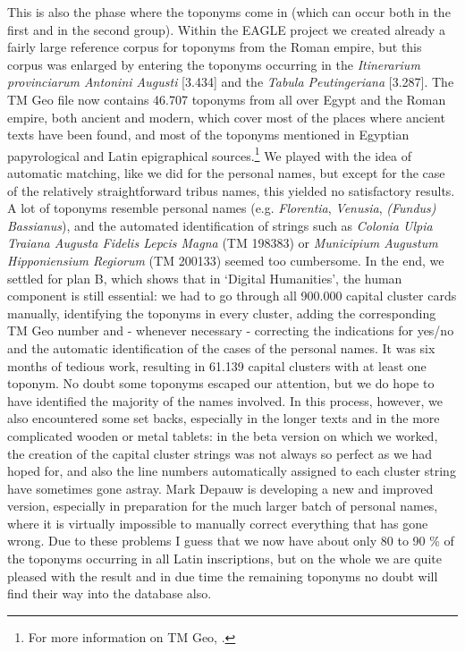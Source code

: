 \documentclass[amsthm,ebook]{saparticle}
\begin{document}
This is also the phase where the toponyms come in (which can occur both in the first and in the second group).
Within the EAGLE project we created already a fairly large reference corpus for toponyms from the Roman empire, but
this corpus was enlarged by entering the toponyms occurring in the \emph{Itinerarium provinciarum Antonini Augusti} [3.434]
and the \emph{Tabula Peutingeriana} [3.287]. The TM Geo file now contains 46.707 toponyms from all over Egypt and the Roman
empire, both ancient and modern, which cover most of the places where ancient texts have been found, and most of the
toponyms mentioned in Egyptian papyrological and Latin epigraphical sources.\footnote{ For more information on TM Geo,
\citep{verreth2013}.} We played with the idea of automatic matching, like we did for the personal
names, but except for the case of the relatively straightforward tribus names, this yielded no satisfactory results. A
lot of toponyms resemble personal names (e.g. \emph{Florentia}, \emph{Venusia}, \emph{(Fundus) Bassianus}), and the automated identification
of strings such as \emph{Colonia Ulpia Traiana Augusta Fidelis Lepcis Magna }(TM 198383) or \emph{Municipium Augustum Hipponiensium
Regiorum} (TM 200133) seemed too cumbersome. In the end, we settled for plan B, which shows that in `Digital
Humanities', the human component is still essential: we had to go through all 900.000 capital cluster cards manually,
identifying the toponyms in every cluster, adding the corresponding TM Geo number and - whenever necessary - correcting
the indications for yes/no and the automatic identification of the cases of the personal names. It was six months of
tedious work, resulting in 61.139 capital clusters with at least one toponym. No doubt some toponyms escaped our
attention, but we do hope to have identified the majority of the names involved. In this process, however, we also
encountered some set backs, especially in the longer texts and in the more complicated wooden or metal tablets: in the
beta version on which we worked, the creation of the capital cluster strings was not always so perfect as we had hoped
for, and also the line numbers automatically assigned to each cluster string have sometimes gone astray. Mark Depauw is
developing a new and improved version, especially in preparation for the much larger batch of personal names, where it
is virtually impossible to manually correct everything that has gone wrong. Due to these problems I guess that we now
have about only 80 to 90 \% of the toponyms occurring in all Latin inscriptions, but on the whole we are quite pleased
with the result and in due time the remaining toponyms no doubt will find their way into the database also.
\end{document}

